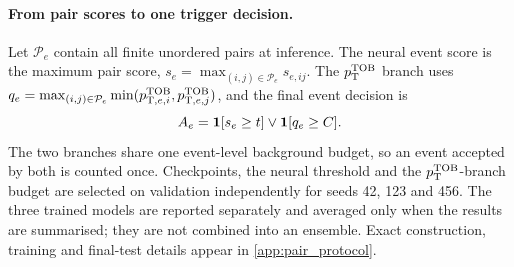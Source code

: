 \paragraph{From pair scores to one trigger decision.}
Let $\mathcal P_e$ contain all finite unordered pairs at inference.
The neural event score is the maximum pair score,
$s_e=\max_{(i,j)\in\mathcal{P}_e}s_{e,ij}$. The $p_{\mathrm{T}}^{\mathrm{TOB}}$ branch uses
$q_e=\max_{(i,j)\in\mathcal{P}_e}\min(p_{\mathrm{T},e,i}^{\mathrm{TOB}},p_{\mathrm{T},e,j}^{\mathrm{TOB}})$, and the
final event decision is
\begin{equation}
  A_e=\mathbf{1}[s_e\geq t]\vee\mathbf{1}[q_e\geq C].
  \label{eq:pair_decision_details}
\end{equation}
The two branches share one event-level background budget, so an event accepted
by both is counted once. Checkpoints, the neural threshold and the
$p_{\mathrm{T}}^{\mathrm{TOB}}$-branch budget are selected on validation independently for seeds 42,
123 and 456.
The three trained models are reported separately and averaged only when the
results are summarised; they are not combined into an ensemble. Exact
construction, training and final-test details appear in
\cref{app:pair_protocol}.

